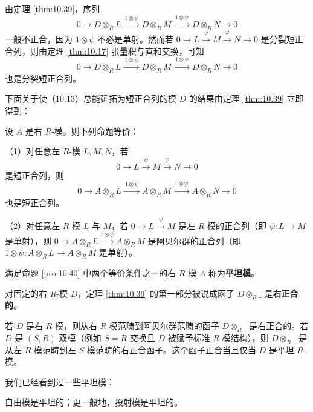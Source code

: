 由定理 \ref{thm:10.39}，序列
\[
0 \longrightarrow D \otimes_R L \xrightarrow{\ 1 \otimes \psi\ } D \otimes_R M \xrightarrow{\ 1 \otimes \varphi\ } D \otimes_R N \longrightarrow 0
\]
一般不正合，因为 \(1 \otimes \psi\) 不必是单射。然而若 \(0 \to L \xrightarrow{\psi} M \xrightarrow{\varphi} N \to 0\) 是分裂短正合列，则由定理 \ref{thm:10.17} 张量积与直和交换，可知
\[
0 \longrightarrow D \otimes_R L \xrightarrow{\ 1 \otimes \psi\ } D \otimes_R M \xrightarrow{\ 1 \otimes \varphi\ } D \otimes_R N \longrightarrow 0
\]
也是分裂短正合列。

下面关于使（10.13）总能延拓为短正合列的模 \(D\) 的结果由定理 \ref{thm:10.39} 立即得到：

\begin{proposition}\label{pro:10.40}
设 \(A\) 是右 \(R\)-模。则下列命题等价：

（1）对任意左 \(R\)-模 \(L, M, N\)，若
\[
0 \longrightarrow L \xrightarrow{\ \psi\ } M \xrightarrow{\ \varphi\ } N \longrightarrow 0
\]
是短正合列，则
\[
0 \longrightarrow A \otimes_R L \xrightarrow{\ 1 \otimes \psi\ } A \otimes_R M \xrightarrow{\ 1 \otimes \varphi\ } A \otimes_R N \longrightarrow 0
\]
也是短正合列。

（2）对任意左 \(R\)-模 \(L\) 与 \(M\)，若 \(0 \to L \xrightarrow{\psi} M\) 是左 \(R\)-模的正合列（即 \(\psi : L \to M\) 是单射），则 \(0 \to A \otimes_R L \xrightarrow{1 \otimes \psi} A \otimes_R M\) 是阿贝尔群的正合列（即 \(1 \otimes \psi : A \otimes_R L \to A \otimes_R M\) 是单射）。
\end{proposition}

\begin{definition}
满足命题 \ref{pro:10.40} 中两个等价条件之一的右 \(R\)-模 \(A\) 称为\textbf{平坦模}。
\end{definition}

对固定的右 \(R\)-模 \(D\)，定理 \ref{thm:10.39} 的第一部分被说成函子 \(D \otimes_R \_\) 是\textbf{右正合的}。

\begin{corollary}\label{cor:10.41}
若 \(D\) 是右 \(R\)-模，则从右 \(R\)-模范畴到阿贝尔群范畴的函子 \(D \otimes_R \_\) 是右正合的。若 \(D\) 是 \((S, R)\)-双模（例如 \(S = R\) 交换且 \(D\) 被赋予标准 \(R\)-模结构），则 \(D \otimes_R \_\) 是从左 \(R\)-模范畴到左 \(S\)-模范畴的右正合函子。这个函子正合当且仅当 \(D\) 是平坦 \(R\)-模。
\end{corollary}

我们已经看到过一些平坦模：

\begin{corollary}\label{cor:10.42}
自由模是平坦的；更一般地，投射模是平坦的。
\end{corollary}

